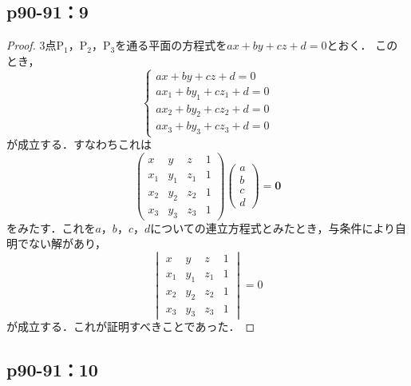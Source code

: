 \documentclass[uplatex,dvipdfmx,a4paper,11pt,fleqn]{jsarticle}
\begin{document}
\newpage 

\subsection*{p90-91：9}

\begin{tleftbar}
    \begin{proof}
    3点$\mathrm{P}_1$，$\mathrm{P_2}$，$\mathrm{P_3}$を通る平面の方程式を$ax+by+cz+d=0$とおく．
    このとき，
    \[
        \begin{cases}
            ax+by+cz + d =0 \\
            ax_1 + by_1 +cz_1 +d =0 \\
            ax_2 + by_2 +cz_2 +d =0 \\
            ax_3 + by_3 +cz_3 +d =0
        \end{cases}
    \]
    が成立する．すなわちこれは
    \[
        \begin{pmatrix} 
            x & y & z & 1 \\
            x_1 & y_1 & z_1& 1 \\
            x_2 & y_2 &z_2 & 1 \\
            x_3 & y_3 &z_3 & 1 
        \end{pmatrix}
        \begin{pmatrix}
            a \\
            b \\
            c \\
            d 
        \end{pmatrix}
        = \bm{0}
    \]
    をみたす．これを$a$，$b$，$c$，$d$についての連立方程式とみたとき，与条件により自明でない解があり，
    \[
    \begin{vmatrix} 
        x & y & z & 1 \\
        x_1 & y_1 & z_1& 1 \\
        x_2 & y_2 &z_2 & 1 \\
        x_3 & y_3 &z_3 & 1 
    \end{vmatrix}
    =0
    \]
    が成立する．これが証明すべきことであった．
\end{proof}
\end{tleftbar}

\newpage

\subsection*{p90-91：10}
\end{document}
